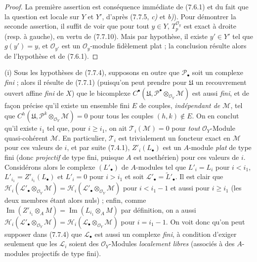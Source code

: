 \begin{proof}
La première assertion est conséquence immédiate de (7.6.1) et du fait que la
question est locale sur $Y$ et $Y'$, d'après (7.7.5, \emph{c)} et \emph{b)}). Pour démontrer
la seconde assertion, il suffit de voir que pour tout $y\in Y$,
$T_p^{\mathscr O_y}$ est exact à droite (resp. à gauche), en vertu de (7.7.10).
Mais par hypothèse, il existe $y'\in Y'$ tel que $g(y')=y$, et
$\mathscr O_{y'}$ est un $\mathscr O_y$-module fidèlement plat ; la conclusion
résulte alors de l'hypothèse et de (7.6.1).
\end{proof}

\begin{remarks}[7.7.12]
\textnormal{(i)} Sous les hypothèses de (7.7.4), supposons en outre que
$\mathscr P_\bullet$ soit un complexe \emph{fini} ; alors il résulte de (7.7.1)
(puisqu'on peut prendre pour $\mathfrak U$ un recouvrement ouvert affine
\emph{fini} de $X$) que le bicomplexe
$C^\bullet(\mathfrak U,\mathscr P^\bullet\otimes_{\mathscr O_Y}\mathscr M)$ est
aussi \emph{fini}, et de façon précise qu'il existe un ensemble fini $E$ de couples,
\emph{indépendant de $\mathscr M$}, tel que
$C^h(\mathfrak U,\mathscr P^k\otimes_{\mathscr O_Y}\mathscr M)=0$ pour tous les couples $(h,k)\notin E$.
On en conclut qu'il existe $i_1$ tel que, pour $i\geq i_1$, on ait
$\mathscr T_i(\mathscr M)=0$ pour \emph{tout} $\mathscr O_Y$-Module
quasi-cohérent $\mathscr M$. En particulier, $\mathscr T_i$ est trivialement un
foncteur exact en $\mathscr M$ pour ces valeurs de $i$, et par suite (7.4.1),
$Z'_i(L_\bullet)$ est un $A$-module \emph{plat} de type fini (donc
\emph{projectif} de type fini, puisque $A$ est noethérien) pour ces valeurs de
$i$. Considérons alors le complexe $(L'_\bullet)$ de $A$-modules tel que
$L'_i=L_i$ pour $i<i_1$, $L'_{i_1}=Z'_{i_1}(L_\bullet)$ et $L'_i=0$ pour
$i>i_1$ et soit $\mathscr L'_\bullet=\widetilde{L}'_\bullet$. Il est clair que
$  \mathscr H_i(\mathscr L'_\bullet\otimes_{\mathscr O_Y}\mathscr M)
  =
  \mathscr H_i(\mathscr L'_\bullet\otimes_{\mathscr O_Y}\mathscr M)$
pour $i<i_1-1$ et aussi pour $i\geq i_1$ (les deux membres étant alors nuls) ;
enfin, comme
$\operatorname{Im}(Z'_{i_1}\otimes_A M)=\operatorname{Im}(L_{i_1}\otimes_A M)$
par définition, on a aussi
$\mathscr H_i(\mathscr L'_\bullet\otimes_{\mathscr O_Y}\mathscr M)
=\mathscr H_i(\mathscr L_\bullet\otimes_{\mathscr O_Y}\mathscr M)$ pour
$i=i_1-1$. On voit donc qu'on peut supposer dans (7.7.4) que
$\mathscr L_\bullet$ est aussi un complexe \emph{fini}, à condition d'exiger
seulement que les $\mathscr L_i$ soient des $\mathscr O_Y$-Modules
\emph{localement libres} (associés à des $A$-modules projectifs de type fini).


\end{remarks}
